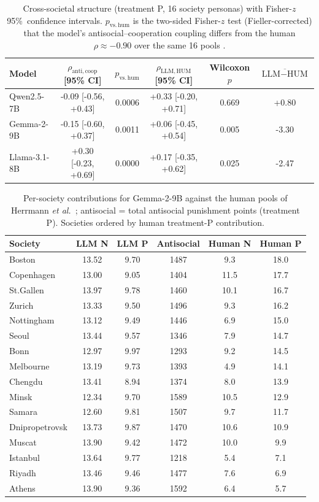 \begin{table}[t]\centering
\caption{Cross-societal structure (treatment P, 16 society personas) with Fisher-$z$ 95\%\ confidence intervals. $p_{\mathrm{vs.\,hum}}$ is the two-sided Fisher-$z$ test (Fieller-corrected) that the model's antisocial--cooperation coupling differs from the human $\rho\approx-0.90$ over the same 16 pools \cite{herrmann2008antisocial}.}
\label{tab:si_cross}
\begin{tabular}{lccccc}\toprule
Model & $\rho_{\mathrm{anti,coop}}$ [95\% CI] & $p_{\mathrm{vs.\,hum}}$ & $\rho_{\mathrm{LLM,HUM}}$ [95\% CI] & Wilcoxon $p$ & $\overline{\text{LLM}-\text{HUM}}$ \\\midrule
Qwen2.5-7B & -0.09 [-0.56, +0.43] & 0.0006 & +0.33 [-0.20, +0.71] & 0.669 & +0.80 \\
Gemma-2-9B & -0.15 [-0.60, +0.37] & 0.0011 & +0.06 [-0.45, +0.54] & 0.005 & -3.30 \\
Llama-3.1-8B & +0.30 [-0.23, +0.69] & 0.0000 & +0.17 [-0.35, +0.62] & 0.025 & -2.47 \\
\bottomrule\end{tabular}\end{table}

\begin{table}[t]\centering
\caption{Per-society contributions for Gemma-2-9B against the human pools of Herrmann \textit{et al.}\ \cite{herrmann2008antisocial}; antisocial = total antisocial punishment points (treatment P). Societies ordered by human treatment-P contribution.}
\label{tab:si_society}
\begin{tabular}{lccccc}\toprule
Society & LLM N & LLM P & Antisocial & Human N & Human P \\\midrule
Boston & 13.52 & 9.70 & 1487 & 9.3 & 18.0 \\
Copenhagen & 13.00 & 9.05 & 1404 & 11.5 & 17.7 \\
St.Gallen & 13.97 & 9.78 & 1460 & 10.1 & 16.7 \\
Zurich & 13.33 & 9.50 & 1496 & 9.3 & 16.2 \\
Nottingham & 13.12 & 9.49 & 1446 & 6.9 & 15.0 \\
Seoul & 13.44 & 9.57 & 1346 & 7.9 & 14.7 \\
Bonn & 12.97 & 9.97 & 1293 & 9.2 & 14.5 \\
Melbourne & 13.19 & 9.73 & 1393 & 4.9 & 14.1 \\
Chengdu & 13.41 & 8.94 & 1374 & 8.0 & 13.9 \\
Minsk & 12.34 & 9.70 & 1589 & 10.5 & 12.9 \\
Samara & 12.60 & 9.81 & 1507 & 9.7 & 11.7 \\
Dnipropetrovsk & 13.73 & 9.87 & 1470 & 10.6 & 10.9 \\
Muscat & 13.90 & 9.42 & 1472 & 10.0 & 9.9 \\
Istanbul & 13.64 & 9.77 & 1218 & 5.4 & 7.1 \\
Riyadh & 13.46 & 9.46 & 1477 & 7.6 & 6.9 \\
Athens & 13.90 & 9.36 & 1592 & 6.4 & 5.7 \\
\bottomrule\end{tabular}\end{table}

